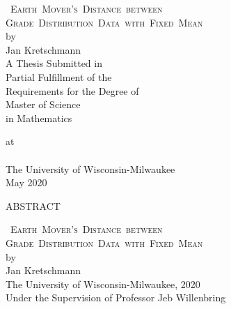 \documentclass[12pt,letterpaper,oneside,openany]{book}
\newcommand{\name}{Jan Kretschmann}
\newcommand{\pglen}{390}
\newcommand{\pts}{12pt}
\newcommand{\vs}{\vspace{0.7cm}}
\newcommand{\mytitle}{\Large \textsc{\mbox{ Earth Mover's Distance between }\\
  \mbox{Grade Distribution Data with Fixed Mean}}\\[20pt] \normalsize by\\
  [20pt] \name  \\[\pts] \vs }
\begin{document}
\setlength{\baselineskip}{19pt}
\frontmatter




\doublespacing
{}

\pagestyle{plain}
\thispagestyle{empty}
\vs\vs 
\begin{center}
	\mytitle
	\singlespacing
	\vs
	A Thesis Submitted in \\
	Partial Fulfillment of the \\
	Requirements for the Degree of \\
	\vs \vs
	Master of Science  \\ %
	in 
	Mathematics 
	\vs \vs

	at\\
	 \ \\
	The University of Wisconsin-Milwaukee\\ 
	May 2020
\end{center}

\pagebreak



%

\begin{center} 
	{\large ABSTRACT} 
\end{center}
\singlespacing
\begin{center}
	\mytitle  The University of Wisconsin-Milwaukee, 2020 \\
	Under the Supervision of Professor Jeb Willenbring 
\end{center}
\end{document}
